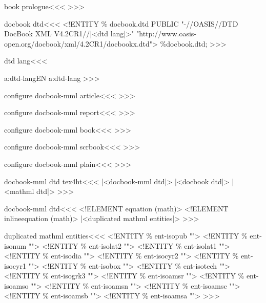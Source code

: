 \<book prologue\><<<
   {}
   {}
>>>


\<docbook dtd\><<<
<!ENTITY \% docbook.dtd PUBLIC\Hnewline
    "-//OASIS//DTD DocBook XML V4.2CR1//|<dtd lang|>"\Hnewline
       "http://www.oasis-open.org/docbook/xml/4.2CR1/docbookx.dtd">
\Hnewline \%docbook.dtd; \Hnewline
>>>


\<dtd lang\><<<
\expandafter
\ifx \csname a:dtd-lang\endcsname\relax EN\else
  \csname a:dtd-lang\endcsname
\fi
>>>



\<configure docbook-mml article\><<< 
   {}
   {}
>>>


\<configure docbook-mml report\><<< 
   {}
   {}
>>>


\<configure docbook-mml book\><<< 
   {}
   {}
>>>


\<configure docbook-mml scrbook\><<< 
   {}
   {}
>>>





\<configure docbook-mml plain\><<< 
   {}
   {}
>>>



\<docbook-mml dtd tex4ht\><<<
|<docbook-mml dtd|>%
|<docbook dtd|>%
|<mathml dtd|>%
>>>


\<docbook-mml dtd\><<<
<!ELEMENT equation (math)>\Hnewline
<!ELEMENT inlineequation (math)>\Hnewline
|<duplicated mathml entities|>%
>>>

\<duplicated mathml entities\><<<
<!ENTITY \% ent-isopub  "">
<!ENTITY \% ent-isonum  "">\Hnewline    
<!ENTITY \% ent-isolat2  "">
<!ENTITY \% ent-isolat1  "">\Hnewline    
<!ENTITY \% ent-isodia  "">
<!ENTITY \% ent-isocyr2  "">\Hnewline    
<!ENTITY \% ent-isocyr1  "">
<!ENTITY \% ent-isobox  "">\Hnewline    
<!ENTITY \% ent-isotech  "">
<!ENTITY \% ent-isogrk3  "">\Hnewline    
<!ENTITY \% ent-isoamsr  "">
<!ENTITY \% ent-isoamso  "">\Hnewline    
<!ENTITY \% ent-isoamsn  "">
<!ENTITY \% ent-isoamsc  "">\Hnewline    
<!ENTITY \% ent-isoamsb  "">
<!ENTITY \% ent-isoamsa  "">\Hnewline  
>>>



